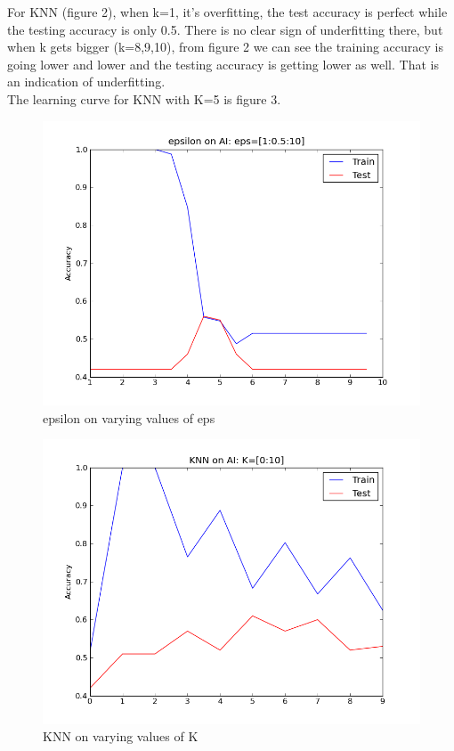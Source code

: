 \documentclass[a4paper,11pt]{article}
\begin{document}
For KNN (figure 2), when k=1, it's overfitting, the test accuracy is perfect while the testing accuracy
is only 0.5. There is no clear sign of underfitting there, but when k
gets bigger (k=8,9,10), from figure 2 we can see the training
accuracy is going lower and lower and the testing accuracy is getting
lower as well. That is an indication of underfitting.\\
The learning curve for KNN with K=5 is figure 3.
\begin{figure}[h!]
  \caption{epsilon on varying values of eps}
 \includegraphics[scale=0.5]{epsOnAi_hyper.png}
\end{figure}
\begin{figure}[h!]
  \caption{KNN on varying values of K}
   \includegraphics[scale=0.5]{knnOnAi_hyper.png}
\end{figure}
\end{document}
